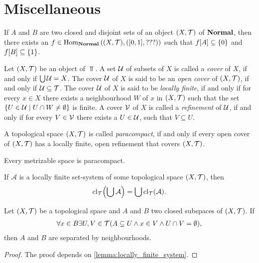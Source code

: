\section{Miscellaneous}

\begin{lemma} \label{lemma:Urysohn} \cite[p. 445]{Ana1&2}
	If $A$ and $B$ are two closed and disjoint sets of an object $\tspace$ of $\Normal$, then there exists an $f \in \Hom_\Normal\pbraces{\tspace, \pbraces{[0,1], ???}}$ such that $f\bbraces{A} \subseteq \{0\}$ and $f\bbraces{B} \subseteq \{1\}$. 
\end{lemma}


\begin{definition}
	Let $\tspace$ be an object of $\Top$. A set $\cover$ of subsets of $X$ is called a \textit{cover} of $X$, if and only if $\bigcup \cover = X$. The cover $\cover$ of $X$ is said to be an \textit{open cover} of $\tspace$, if and only if $\cover \subseteq \mathcal{T}$. The cover $\cover$ of $X$ is said to be \textit{locally finite}, if and only if for every $x \in X$ there exists a neighbourhood $W$ of $x$ in $\tspace$ such that the set $\Bbraces{U \in \cover\mid U \cap W \neq \emptyset}$ is finite. A cover $\cover[V]$ of $X$ is called a \textit{refinement} of $\cover$, if and only if for every $V \in \cover[V]$ there exists a $U \in \cover$, such that $V \subseteq U$. 
\end{definition}

\begin{definition}
	A topological space $\tspace$ is called \textit{paracompact}, if and only if every open cover of $\tspace$ has a locally finite, open refinement that covers $\tspace$. 
\end{definition}

\begin{theorem}\label{theorem:stone}
	Every metrizable space is paracompact. \cite{Top}
\end{theorem}

\begin{lemma} \label{lemma:locally_finite_system} \cite[p. 63]{Top}
	If $\mathcal{A}$ is a locally finite set-system of some topological space $\tspace$, then
	\begin{align*}
		\cl{\bigcup \mathcal{A}} = \bigcup \cl{\mathcal{A}}.
	\end{align*}
\end{lemma}

\begin{lemma} \label{lemma:para_separation} \cite[p. 71]{Top}
	Let $\tspace$ be a topological space and $A$ and $B$ two closed subspaces of $\tspace$. If 
	\begin{align*}
		\forall x \in B\exists U, V \in \mathcal{T}\pbraces{A \subseteq U \land x \in V \land U \cap V = \emptyset},
	\end{align*}
	then $A$ and $B$ are separated by neighbourhoods. 
\end{lemma}
\begin{proof}
	The proof depends on \ref{lemma:locally_finite_system}.
\end{proof}

